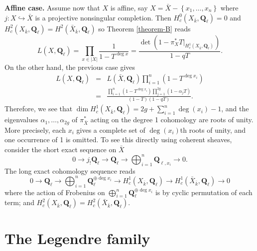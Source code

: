 \medskip\noindent
{\bf Affine case.}
Assume now that $X$ is affine, say $X= \bar X-\left\{x_1, \ldots, x_n\right\}$
where $j : X \hookrightarrow \bar X$ is a projective nonsingular completion.
Then $H_c^0(X_{\bar k}, \mathbf{Q}_\ell) = 0$ and $H_c^2(X_{\bar k},
\mathbf{Q}_\ell) = H^2(\bar X_{\bar k}, \mathbf{Q}_\ell)$ so
Theorem \ref{theorem-B}
reads
$$
L(X, \mathbf{Q}_\ell) = \prod_{x \in |X|}\frac{1}{1 - T^{\deg x}} =
\frac{\det(1-\pi_X^*T |_{H_c^1(X_{\bar k}, \mathbf{Q}_\ell)})}{1 - qT}.
$$
On the other hand, the previous case gives
\begin{eqnarray*}
L(X, \mathbf{Q}_\ell) & = & L(\bar X,
\mathbf{Q}_\ell)\prod_{i = 1}^n\left(1-T^{\deg x_i}\right) \\
& = & \frac{\prod_{i = 1}^n(1-T^{\deg
x_i})\prod_{j = 1}^{2g}(1-\alpha_jT)}{(1-T)(1-qT)}.
\end{eqnarray*}
Therefore, we see that $\dim H_c^1(X_{\bar k}, \mathbf{Q}_\ell) =
2g+\sum_{i = 1}^n \deg(x_i)-1$, and the eigenvalues $\alpha_1, \ldots,
\alpha_{2g}$ of $\pi_{\bar X}^*$ acting on the degree 1 cohomology are roots of
unity. More precisely, each $x_i$ gives a complete set of $\deg(x_i)$th roots
of unity, and one occurrence of 1 is omitted. To see this directly using
coherent sheaves, consider the short exact sequence on $\bar X$
$$
0\to j_!\mathbf{Q}_\ell\to \mathbf{Q}_\ell\to\bigoplus_{i = 1}^n
\mathbf{Q}_{\ell, x_i}\to 0.
$$
The long exact cohomology sequence reads
$$
0\to \mathbf{Q}_\ell \to \bigoplus_{i = 1}^n \mathbf{Q}_\ell^{\oplus \deg x_i}
\to H_c^1(X_{\bar k}, \mathbf{Q}_\ell) \to H_c^1(\bar X_{\bar k},
\mathbf{Q}_\ell)\to 0
$$
where the action of Frobenius on $\bigoplus_{i = 1}^n \mathbf{Q}_\ell^{\oplus
\deg x_i}$ is by cyclic permutation of each term; and $H_c^2(X_{\bar k},
\mathbf{Q}_\ell) = H_c^2(\bar X_{\bar k}, \mathbf{Q}_\ell)$.






\section{The Legendre family}
\label{section-legendre-family}

